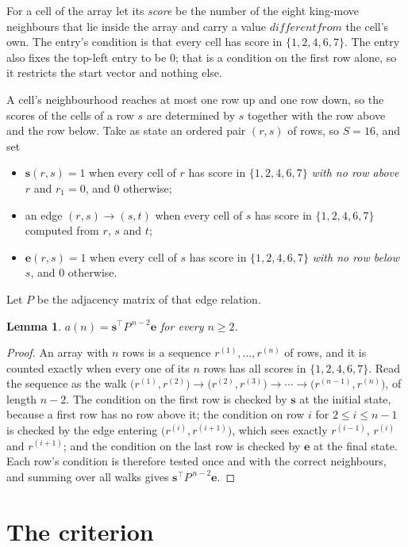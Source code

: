 \documentclass[11pt,a4paper]{article}
\theoremstyle{plain}
\newtheorem{lemma}[theorem]{Lemma}
\theoremstyle{definition}
\begin{document}
For a cell of the array let its \emph{score} be the number of the eight king-move neighbours that lie inside
the array and carry a value $different from$ the cell's own. The entry's condition is that every cell
has score in $\{1,2,4,6,7\}$. The entry also fixes the top-left entry to be $0$; that is a condition on the first row alone, so it restricts the start vector and nothing else.

A cell's neighbourhood reaches at most one row up and one row down, so the scores of the
cells of a row $s$ are determined by $s$ together with the row above and the row below.
Take as state an ordered pair $(r,s)$ of rows, so $S=16$, and set
\begin{itemize}
\item $\mathbf{s}(r,s)=1$ when every cell of $r$ has score in $\{1,2,4,6,7\}$ \emph{with no row
above $r$} and $r_1=0$, and $0$ otherwise;
\item an edge $(r,s)\to(s,t)$ when every cell of $s$ has score in $\{1,2,4,6,7\}$ computed from
$r$, $s$ and $t$;
\item $\mathbf{e}(r,s)=1$ when every cell of $s$ has score in $\{1,2,4,6,7\}$ \emph{with no row
below $s$}, and $0$ otherwise.
\end{itemize}
Let $P$ be the adjacency matrix of that edge relation.

\begin{lemma}\label{lem:walk}
$a(n)=\mathbf{s}^{\!\top}P^{\,n-2}\mathbf{e}$ for every $n\ge2$.
\end{lemma}

\begin{proof}
An array with $n$ rows is a sequence $r^{(1)},\dots,r^{(n)}$ of rows, and it is counted
exactly when every one of its $n$ rows has all scores in $\{1,2,4,6,7\}$. Read the sequence as the
walk $\bigl(r^{(1)},r^{(2)}\bigr)\to\bigl(r^{(2)},r^{(3)}\bigr)\to\cdots\to
\bigl(r^{(n-1)},r^{(n)}\bigr)$, of length $n-2$. The condition on the first row is
checked by $\mathbf{s}$ at the initial state, because a first row has no row above it; the
condition on row $i$ for $2\le i\le n-1$ is checked by the edge entering
$\bigl(r^{(i)},r^{(i+1)}\bigr)$, which sees exactly $r^{(i-1)}$, $r^{(i)}$ and
$r^{(i+1)}$; and the condition on the last row is checked by $\mathbf{e}$ at the final
state. Each row's condition is therefore tested once and with the correct neighbours, and
summing over all walks gives $\mathbf{s}^{\!\top}P^{\,n-2}\mathbf{e}$.
\end{proof}

\section{The criterion}
\end{document}
